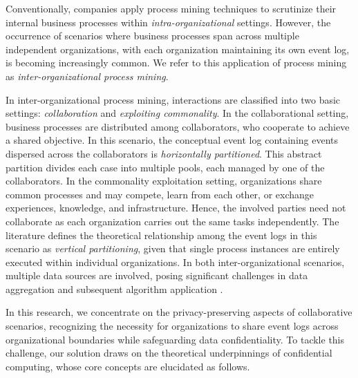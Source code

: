\begin{newj}
Conventionally, companies apply process mining techniques to scrutinize their internal business processes within \emph{intra-organizational} settings. However, the occurrence of scenarios where business processes span across multiple independent organizations, with each organization maintaining its own event log, is becoming increasingly common. We refer to this application of process mining as \emph{inter-organizational process mining}.  

In inter-organizational process mining, interactions are classified into two basic settings: \emph{collaboration} and \emph{exploiting commonality}. In the collaborational setting, business processes are distributed among collaborators, who cooperate to achieve a shared objective. In this scenario, the conceptual event log containing events dispersed across the collaborators is \emph{horizontally partitioned}. This abstract partition divides each case into multiple pools, each managed by one of the collaborators. In the commonality exploitation setting, organizations share common processes and may compete, learn from each other, or exchange experiences, knowledge, and infrastructure. Hence, the involved parties need not collaborate as each organization carries out the same tasks independently. The literature defines the theoretical relationship among the event logs in this scenario as \emph{vertical partitioning}, given that single process instances are entirely executed within individual organizations. In both inter-organizational scenarios, multiple data sources are involved, posing significant challenges in data aggregation and subsequent algorithm application \cite{van2011intra}.

In this research, we concentrate on the privacy-preserving aspects of collaborative scenarios, recognizing the necessity for organizations to share event logs across organizational boundaries while safeguarding data confidentiality. To tackle this challenge, our solution draws on the theoretical underpinnings of confidential computing, whose core concepts are elucidated as follows.


\end{newj}
